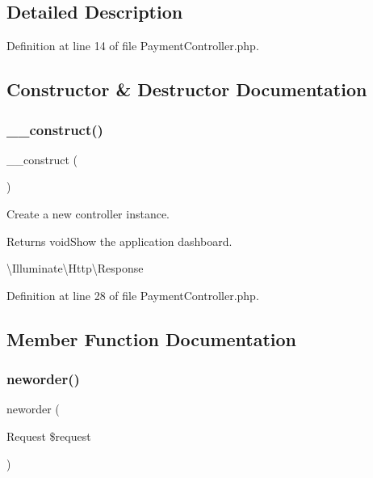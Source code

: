 \subsection{Detailed Description}


Definition at line 14 of file Payment\+Controller.\+php.



\subsection{Constructor \& Destructor Documentation}
\mbox{\label{class_responsive_1_1_http_1_1_controllers_1_1_payment_controller_a095c5d389db211932136b53f25f39685}} 
\subsubsection{\texorpdfstring{\_\_construct()}{\_\_construct()}}
{\footnotesize\ttfamily \+\_\+\+\_\+construct (\begin{DoxyParamCaption}{ }\end{DoxyParamCaption})}

Create a new controller instance.

\begin{DoxyReturn}{Returns}
void\+Show the application dashboard.

\textbackslash{}\+Illuminate\textbackslash{}\+Http\textbackslash{}\+Response 
\end{DoxyReturn}


Definition at line 28 of file Payment\+Controller.\+php.



\subsection{Member Function Documentation}
\mbox{\label{class_responsive_1_1_http_1_1_controllers_1_1_payment_controller_ad49ed12ec9196d3d81e10d974539a0fa}} 
\subsubsection{\texorpdfstring{neworder()}{neworder()}}
{\footnotesize\ttfamily neworder (\begin{DoxyParamCaption}\item[{Request}]{\$request }\end{DoxyParamCaption})}



